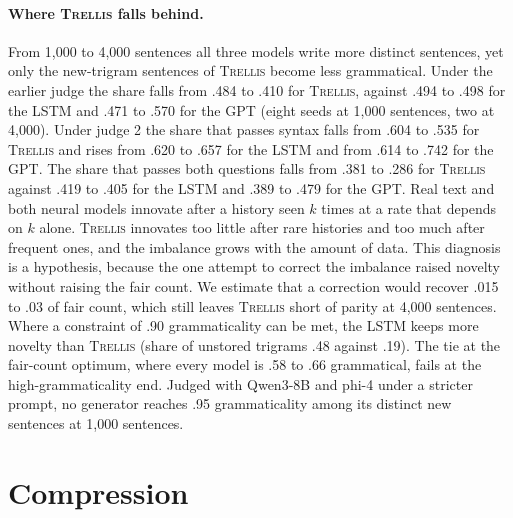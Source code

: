\documentclass[11pt,letterpaper]{article}
\newcommand{\trellis}{\textsc{Trellis}}
\begin{document}
\paragraph{Where \trellis{} falls behind.} From 1,000 to 4,000 sentences all three models write more distinct sentences, yet only the new-trigram sentences of \trellis{} become less grammatical.
Under the earlier judge the share falls from .484 to .410 for \trellis{}, against .494 to .498 for the LSTM and .471 to .570 for the GPT (eight seeds at 1,000 sentences, two at 4,000).
Under judge 2 the share that passes syntax falls from .604 to .535 for \trellis{} and rises from .620 to .657 for the LSTM and from .614 to .742 for the GPT. The share that passes both questions falls from .381 to .286 for \trellis{} against .419 to .405 for the LSTM and .389 to .479 for the GPT.
Real text and both neural models innovate after a history seen $k$ times at a rate that depends on $k$ alone. \trellis{} innovates too little after rare histories and too much after frequent ones, and the imbalance grows with the amount of data.
This diagnosis is a hypothesis, because the one attempt to correct the imbalance raised novelty without raising the fair count. We estimate that a correction would recover .015 to .03 of fair count, which still leaves \trellis{} short of parity at 4,000 sentences.
Where a constraint of .90 grammaticality can be met, the LSTM keeps more novelty than \trellis{} (share of unstored trigrams .48 against .19). The tie at the fair-count optimum, where every model is .58 to .66 grammatical, fails at the high-grammaticality end.
Judged with Qwen3-8B and phi-4 under a stricter prompt, no generator reaches .95 grammaticality among its distinct new sentences at 1,000 sentences.

\section{Compression}
\end{document}
